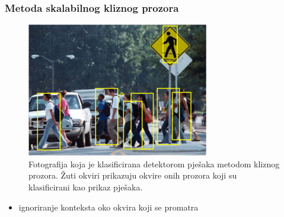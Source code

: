 \documentclass{beamer}
\begin{document}
\begin{frame}
\frametitle{Metoda skalabilnog kliznog prozora}

\begin{figure}
\center
\includegraphics[scale=0.7]{img/crossing.png}
\caption{Fotografija koja je klasificirana detektorom pješaka metodom kliznog prozora. Žuti okviri prikazuju okvire onih prozora koji su klasificirani kao prikaz pješaka.}
\label{primjer_klasifikacije}
\end{figure}
\begin{itemize}
\item ignoriranje konteksta oko okvira koji se promatra 
\end{itemize}
\end{frame}
\end{document}
